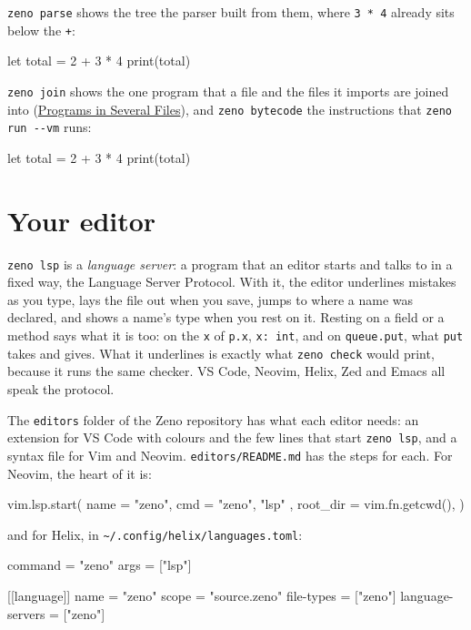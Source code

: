 \verb|zeno parse| shows the tree the parser built from them, where
\verb|3 * 4| already sits below the \verb|+|:

\begin{zeno}[file=tiny.zeno, dir=see, cmd=zeno parse {file}]
let total = 2 + 3 * 4
print(total)
\end{zeno}

\verb|zeno join| shows the one program that a file and the files it
imports are joined into (\hyperref[ch-modules]{Programs in Several
Files}), and \verb|zeno bytecode| the instructions that
\verb|zeno run --vm| runs:

\begin{zeno}[file=tiny.zeno, dir=see, cmd=zeno bytecode {file}]
let total = 2 + 3 * 4
print(total)
\end{zeno}

\section{Your editor}

\verb|zeno lsp| is a \emph{language server}: a program that an editor
starts and talks to in a fixed way, the Language Server Protocol. With
it, the editor underlines mistakes as you type, lays the file out when
you save, jumps to where a name was declared, and shows a name's type
when you rest on it. Resting on a field or a method says what it is
too: on the \verb|x| of \verb|p.x|, \verb|x: int|, and on
\verb|queue.put|, what \verb|put| takes and gives. What it underlines is exactly what
\verb|zeno check| would print, because it runs the same checker. VS
Code, Neovim, Helix, Zed and Emacs all speak the protocol.

The \verb|editors| folder of the Zeno repository has what each editor
needs: an extension for VS Code with colours and the few lines that
start \verb|zeno lsp|, and a syntax file for Vim and Neovim.
\verb|editors/README.md| has the steps for each. For Neovim, the
heart of it is:

\begin{zenofrag}[lang=shell]
vim.lsp.start({
  name = "zeno",
  cmd = { "zeno", "lsp" },
  root_dir = vim.fn.getcwd(),
})
\end{zenofrag}

and for Helix, in \verb|~/.config/helix/languages.toml|:

\begin{zenofrag}
command = "zeno"
args = ["lsp"]

[[language]]
name = "zeno"
scope = "source.zeno"
file-types = ["zeno"]
language-servers = ["zeno"]
\end{zenofrag}

